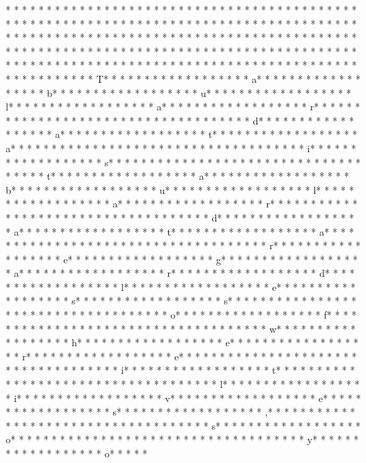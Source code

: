 * * *  * * *  * * *  *  * * *  *  * * *  * 	* * *  * * *  * * *  *  * * *  *  * * *  * 	* * *  * * *  * * *  *  * * *  *  * * *  * 	* * *  * * *  * * *  *  * * *  *  * * *  * * *  * * *  *  * * *  *  * * *  * * *  * * *  *  * * *  *  * * *  *  * * *  * * *  * * *  *  * * *  *  * * *  *  * * *  * * *  * * *  *  * * *  *  * * *  *  * * *  * * *  * * *  *  * * *  *  * * *  *  * * *  * * *  * * *  *  * * *  *  * * *  *  * * *  * * *  * * *  *  * * *  *  * * *  *  * * *  * * *  * * *  *  * * *  *  * * *  *  * * *  * * *  * * *  *  * * *  *  * * *  * T* * *  * * *  * * *  *  * * *  *  * * *  * a* * *  * * *  * * *  *  * * *  *  * * *  * b* * *  * * *  * * *  *  * * *  *  * * *  * u* * *  * * *  * * *  *  * * *  *  * * *  * l* * *  * * *  * * *  *  * * *  *  * * *  * a* * *  * * *  * * *  *  * * *  *  * * *  * r* * *  * * *  * * *  *  * * *  *  * * *  *  * * *  * * *  * * *  *  * * *  *  * * *  * d* * *  * * *  * * *  *  * * *  *  * * *  * a* * *  * * *  * * *  *  * * *  *  * * *  * t* * *  * * *  * * *  *  * * *  *  * * *  * a* * *  * * *  * * *  *  * * *  *  * * *  *  * * *  * * *  * * *  *  * * *  *  * * *  * i* * *  * * *  * * *  *  * * *  *  * * *  * s* * *  * * *  * * *  *  * * *  *  * * *  *  * * *  * * *  * * *  *  * * *  *  * * *  * t* * *  * * *  * * *  *  * * *  *  * * *  * a* * *  * * *  * * *  *  * * *  *  * * *  * b* * *  * * *  * * *  *  * * *  *  * * *  * u* * *  * * *  * * *  *  * * *  *  * * *  * l* * *  * * *  * * *  *  * * *  *  * * *  * a* * *  * * *  * * *  *  * * *  *  * * *  * r* * *  * * *  * * *  *  * * *  *  * * *  *  * * *  * * *  * * *  *  * * *  *  * * *  * d* * *  * * *  * * *  *  * * *  *  * * *  * a* * *  * * *  * * *  *  * * *  *  * * *  * t* * *  * * *  * * *  *  * * *  *  * * *  * a* * *  * * *  * * *  *  * * *  *  * * *  *  * * *  * * *  * * *  *  * * *  *  * * *  * r* * *  * * *  * * *  *  * * *  *  * * *  * e* * *  * * *  * * *  *  * * *  *  * * *  * g* * *  * * *  * * *  *  * * *  *  * * *  * a* * *  * * *  * * *  *  * * *  *  * * *  * r* * *  * * *  * * *  *  * * *  *  * * *  * d* * *  * * *  * * *  *  * * *  *  * * *  * l* * *  * * *  * * *  *  * * *  *  * * *  * e* * *  * * *  * * *  *  * * *  *  * * *  * s* * *  * * *  * * *  *  * * *  *  * * *  * s* * *  * * *  * * *  *  * * *  *  * * *  *  * * *  * * *  * * *  *  * * *  *  * * *  * o* * *  * * *  * * *  *  * * *  *  * * *  * f* * *  * * *  * * *  *  * * *  *  * * *  *  * * *  * * *  * * *  *  * * *  *  * * *  * w* * *  * * *  * * *  *  * * *  *  * * *  * h* * *  * * *  * * *  *  * * *  *  * * *  * e* * *  * * *  * * *  *  * * *  *  * * *  * r* * *  * * *  * * *  *  * * *  *  * * *  * e* * *  * * *  * * *  *  * * *  *  * * *  *  * * *  * * *  * * *  *  * * *  *  * * *  * i* * *  * * *  * * *  *  * * *  *  * * *  * t* * *  * * *  * * *  *  * * *  *  * * *  *  * * *  * * *  * * *  *  * * *  *  * * *  * l* * *  * * *  * * *  *  * * *  *  * * *  * i* * *  * * *  * * *  *  * * *  *  * * *  * v* * *  * * *  * * *  *  * * *  *  * * *  * e* * *  * * *  * * *  *  * * *  *  * * *  * s* * *  * * *  * * *  *  * * *  *  * * *  * ,* * *  * * *  * * *  *  * * *  *  * * *  *  * * *  * * *  * * *  *  * * *  *  * * *  * s* * *  * * *  * * *  *  * * *  *  * * *  * o* * *  * * *  * * *  *  * * *  *  * * *  *  * * *  * * *  * * *  *  * * *  *  * * *  * y* * *  * * *  * * *  *  * * *  *  * * *  * o* * *  * * 